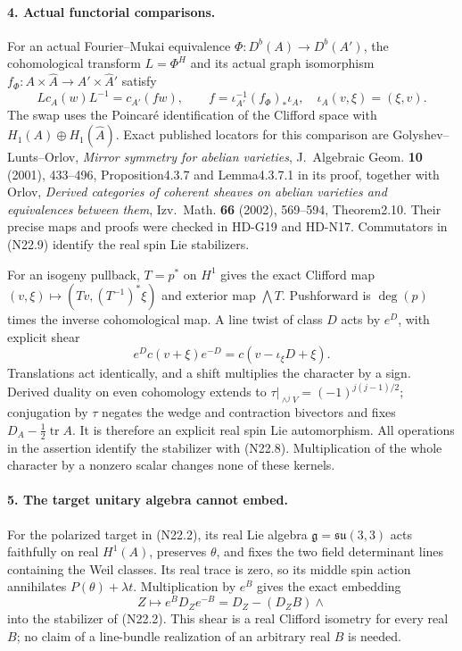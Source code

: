 \paragraph{4. Actual functorial comparisons.}
For an actual Fourier--Mukai equivalence
$\Phi:D^b(A)\to D^b(A')$, the
cohomological transform $L=\Phi^H$ and its actual graph
isomorphism $f_\Phi:A\times\widehat A\to
A'\times\widehat A'$ satisfy
\begin{equation}
 Lc_A(w)L^{-1}=c_{A'}(fw),\qquad
 f=\iota_{A'}^{-1}(f_\Phi)_*\iota_A,
             \quad\iota_A(v,\xi)=(\xi,v).           \tag{N22.9}
\end{equation}
The swap uses the Poincar\'e identification of the Clifford
space with $H_1(A)\oplus H_1(\widehat A)$.
Exact published locators for this comparison are
Golyshev--Lunts--Orlov, \emph{Mirror symmetry for abelian varieties},
J.~Algebraic Geom. \textbf{10} (2001), 433--496,
Proposition4.3.7 and Lemma4.3.7.1 in its proof, together with
Orlov, \emph{Derived categories of coherent sheaves on abelian
varieties and equivalences between them}, Izv.~Math.
\textbf{66} (2002), 569--594, Theorem2.10.
Their precise maps and proofs were checked in HD-G19 and HD-N17.
Commutators in (N22.9) identify the real spin Lie stabilizers.

For an isogeny pullback, $T=p^*$ on $H^1$ gives the exact
Clifford map $(v,\xi)\mapsto(Tv,(T^{-1})^*\xi)$ and exterior
map $\bigwedge T$. Pushforward is $\deg(p)$ times the inverse
cohomological map. A line twist of class $D$ acts by $e^D$,
with explicit shear
\[
             e^D c(v+\xi)e^{-D}
                    =c(v-\iota_\xi D+\xi).
\]
Translations act identically, and a shift multiplies the
character by a sign. Derived duality on even cohomology extends
to $\tau|_{\wedge^j V}=(-1)^{j(j-1)/2}$; conjugation by
$\tau$ negates the wedge and contraction bivectors and fixes
$D_A-\tfrac12\operatorname{tr}A$. It is therefore an explicit
real spin Lie automorphism. All operations in the assertion
identify the stabilizer with (N22.8). Multiplication of the
whole character by a nonzero scalar changes none of these kernels.

\paragraph{5. The target unitary algebra cannot embed.}
For the polarized target in (N22.2), its real Lie algebra
$\mathfrak g=\mathfrak{su}(3,3)$ acts faithfully on real
$H^1(A)$, preserves $\theta$, and fixes the two field determinant
lines containing the Weil classes. Its real trace is zero,
so its middle spin action annihilates $P(\theta)+\lambda t$.
Multiplication by $e^B$ gives the exact embedding
\[
       Z\longmapsto e^B D_Ze^{-B}
                    =D_Z-(D_ZB)\wedge
\]
into the stabilizer of (N22.2). This shear is a real Clifford
isometry for every real $B$; no claim of a line-bundle realization
of an arbitrary real $B$ is needed.

